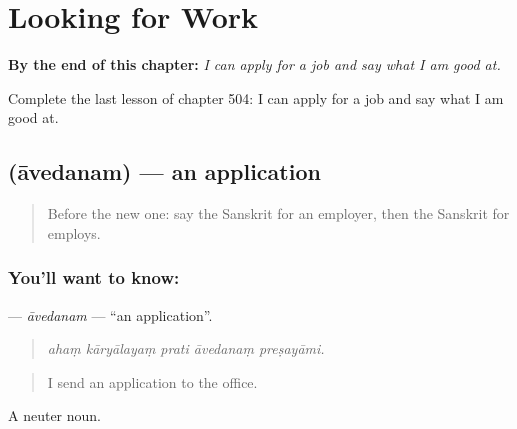 
\chapter{Looking for Work}
\label{ch:sa-looking-for-work}

\begin{chapteropening}
\textbf{By the end of this chapter:} \emph{I can apply for a job and say what I am good at.}

Complete the last lesson of chapter 504: I can apply for a job and say what I am good at.
\end{chapteropening}

\section[\texorpdfstring{\sk{आवेदनम्} (āvedanam)}{आवेदनम् (āvedanam)}]{ (āvedanam) — an application}

\label{lesson:SA-C504-avedanam}



\begin{quote}
Before the new one: say the Sanskrit for an employer, then the Sanskrit for employs.
\end{quote}

\subsection*{You'll want to know: }
\textbf{} — \emph{āvedanam} — \textquotedblleft{}an application\textquotedblright{}.

\begin{quote}
    
\end{quote}

\begin{quote}
\emph{ahaṃ kāryālayaṃ prati āvedanaṃ preṣayāmi.}
\end{quote}

\begin{quote}
I send an application to the office.
\end{quote}

A neuter noun.

